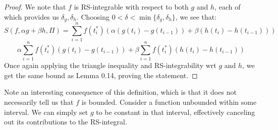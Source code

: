 \documentclass[10pt,letterpaper]{article} %
\begin{document}
\begin{proof}
We note that $f$ is RS-integrable with respect to both $g$ and $h$, each of which provides us $\delta_g, \delta_h$. Choosing $0 < \delta < \min\{\delta_g, \delta_h\}$, we see that:
\begin{equation*}
  S(f, \alpha g + \beta h, \Pi) = \sum_{i=1}^{n}f(t_i^*)(\alpha(g(t_i) - g(t_{i-1})) + \beta(h(t_i) - h(t_{i-1})))
\end{equation*}
\begin{equation*}
  \alpha \sum_{i=1}^{n}f(t_i^*)(g(t_i) - g(t_{i-1})) + \beta \sum_{i=1}^{n}f(t_i^*)(h(t_i) - h(t_{i-1}))
\end{equation*}
Once again applying the triangle inequality and RS-integrability wrt $g$ and $h$, we get the same bound as Lemma 0.14, proving the statement.
\end{proof}

Note an interesting consequence of this definition, which is that it does not necessarily tell us that $f$ is bounded. Consider a function unbounded within some interval. We can simply set $g$ to be constant in that interval, effectively canceling out its contributions to the RS-integral.\\
\end{document}
